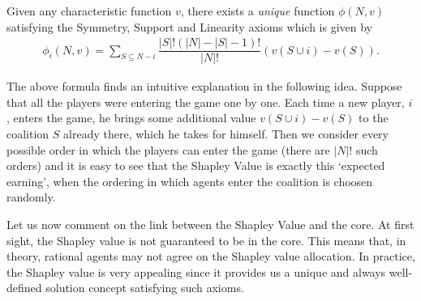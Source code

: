 \begin{theorem}
Given any characteristic function $v$, there exists a \emph{unique} function $\phi(N,v)$ satisfying the Symmetry, Support and Linearity axioms which is given by
\begin{align*}
	\phi_i(N,v) = \sum_{S \subseteq N -i}{\dfrac{|S|!(|N| - |S| - 1)!}{|N|!} (v(S \cup {i}) - v(S))}.
\end{align*}
\end{theorem}


The above formula finds an intuitive explanation in the following idea. Suppose that all the players were entering the game one by one. Each time a new player, $i$, enters the game, he brings some additional value $v(S \cup {i}) - v(S)$ to the coalition $S$ already there, which he takes for himself. Then we consider every possible order in which the players can enter the game (there are $|N|!$ such orders) and it is easy to see that the Shapley Value is exactly this `expected earning', when the ordering in which agents enter the coalition is choosen randomly.

Let us now comment on the link between the Shapley Value and the core.
At first sight, the Shapley value is not guaranteed to be in the core. This means that, in theory, rational agents may not agree on the Shapley value allocation. In practice, the Shapley value is very appealing since it provides us a unique and always well-defined solution concept satisfying such axioms.

